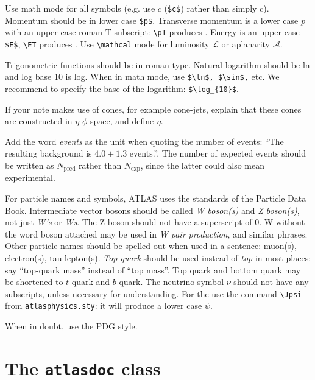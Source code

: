 \documentclass[UKenglish]{latex/atlasdoc}
\begin{document}
Use math mode for all symbols (e.g. use $c$ (\verb|$c$|) rather than simply c). 
Momentum should be in lower case \verb+$p$+. 
Transverse momentum is a lower case $p$ with an upper case roman $\text{T}$ subscript: 
\verb|\pT| produces \pT.
Energy is an upper case \verb+$E$+, \verb+\ET+ produces \ET.  
Use \verb|\mathcal| mode for luminosity $\mathcal{L}$ or aplanarity
$\mathcal{A}$.

Trigonometric functions should be in roman type. Natural logarithm
should be ln and log base 10 is log.  When in math mode, use
\verb+$\ln$, $\sin$,+ etc. We recommend to specify the base of the
logarithm: \verb+$\log_{10}$+.

If your note makes use of cones, for example cone-jets, explain that
these cones are constructed in $\eta$-$\phi$ space, and define $\eta$.

Add the word \emph{events} as the unit when quoting the number of
events: \enquote{The resulting background is $4.0 \pm 1.3$ events.}.  The
number of expected events should be written as $N_{\text{pred}}$ rather
than $N_{\text{exp}}$, since the latter could also mean experimental.

For particle names and symbols, ATLAS uses the standards of the
Particle Data Book. Intermediate vector bosons should be called
\emph{W boson(s)} and \emph{Z boson(s)}, not just \emph{W's} or
\emph{Ws}. The Z boson should not have a superscript of 0. W without
the word boson attached may be used in \emph{W pair production}, and
similar phrases.  Other particle names should be spelled out when used
in a sentence: muon(s), electron(s), tau lepton(s). \emph{Top quark}
should be used instead of \emph{top} in most places: 
say \enquote{top-quark mass} instead of \enquote{top mass}.
Top quark and bottom quark may be shortened to $t$ quark and $b$ quark. 
The neutrino symbol $\nu$ should not have any subscripts, unless necessary for
understanding.
For the \Jpsi{} use the command \verb+\Jpsi+ from 
\texttt{atlasphysics.sty}: it will produce a lower case $\psi$.

When in doubt, use the PDG style.


\section{The \texttt{atlasdoc} class}
\label{sec:atlasdoc}
\end{document}
